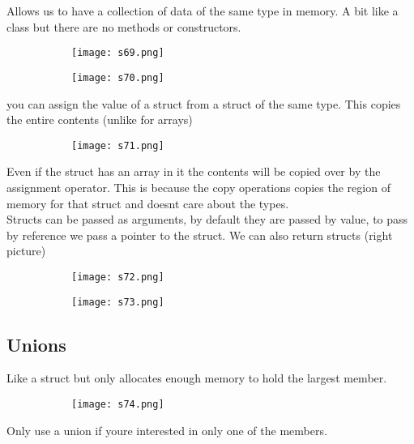 \documentclass[8pt]{extreport}
\begin{document}
Allows us to have a collection of data of the same type in memory. A bit like a class but there are no methods or constructors.
\begin{figure}[H]
\centering
\begin{subfigure}[b]{0.4\linewidth}
\texttt{[image: s69.png]}
\end{subfigure}
\begin{subfigure}[b]{0.4\linewidth}
\texttt{[image: s70.png]}
\end{subfigure}
\end{figure}
you can assign the value of a struct from a struct of the same type. This copies the entire contents (unlike for arrays)
\begin{figure}[H]
\centering
\begin{subfigure}[b]{0.4\linewidth}
\texttt{[image: s71.png]}
\end{subfigure}
\end{figure}
Even if the struct has an array in it the contents will be copied over by the assignment operator. This is because the copy operations copies the region of memory for that struct and doesnt care about the types.\\
Structs can be passed as arguments, by default they are passed by value, to pass by reference we pass a pointer to the struct. We can also return structs (right picture)
\begin{figure}[H]
\centering
\begin{subfigure}[b]{0.4\linewidth}
\texttt{[image: s72.png]}
\end{subfigure}
\begin{subfigure}[b]{0.4\linewidth}
\texttt{[image: s73.png]}
\end{subfigure}
\end{figure}
\subsection{Unions}
Like a struct but only allocates enough memory to hold the largest member.
\begin{figure}[H]
\centering
\begin{subfigure}[b]{0.4\linewidth}
\texttt{[image: s74.png]}
\end{subfigure}
\end{figure}
Only use a union if youre interested in only one of the members.
\end{document}
